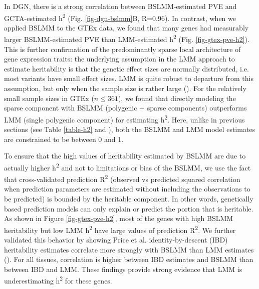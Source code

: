 \documentclass[10pt,letterpaper]{article}
\begin{document}
In DGN, there is a strong correlation between BSLMM-estimated PVE and GCTA-estimated h\textsuperscript{2} (Fig. \ref{fig-dgn-bslmm}B, R=0.96). In contrast, when we applied BSLMM to the GTEx data, we found that many genes had measurably larger BSLMM-estimated PVE than LMM-estimated h\textsuperscript{2} (Fig. \ref{fig-gtex-pve-h2}). This is further confirmation of the predominantly sparse local architecture of gene expression traits: the underlying assumption in the LMM approach to estimate heritability is that the genetic effect sizes are normally distributed, i.e. most variants have small effect sizes. LMM is quite robust to departure from this assumption, but only when the sample size is rather large (). For the relatively small sample sizes in GTEx (\(n \leq 361\)), we found that directly modeling the sparse component with BSLMM (polygenic + sparse components) outperforms LMM (single polygenic component) for estimating h\textsuperscript{2}. Here, unlike in previous sections (see Table \ref{table-h2} and ), both the BSLMM and LMM model estimates are constrained to be between 0 and 1. 

To ensure that the high values of heritability estimated by BSLMM are due to actually higher h\textsuperscript{2} and not to limitations or bias of the BSLMM, we use the fact that cross-validated prediction R\textsuperscript{2} (observed vs predicted squared correlation when prediction parameters are estimated without including the observations to be predicted) is bounded by the heritable component. In other words, genetically based prediction models can only explain or predict the portion that is heritable. As shown in Figure \ref{fig-gtex-pve-h2}, most of the genes with high BSLMM heritability but low LMM h\textsuperscript{2} have large values of prediction R\textsuperscript{2}. 
We further validated this behavior by showing Price et al. \cite{Price_2011} identity-by-descent (IBD) heritability estimates correlate more strongly with BSLMM than LMM estimates (). For all tissues, correlation is higher between IBD estimates and BSLMM than between IBD and LMM. These findings provide strong evidence that LMM is underestimating h\textsuperscript{2} for these genes.

\end{document}
